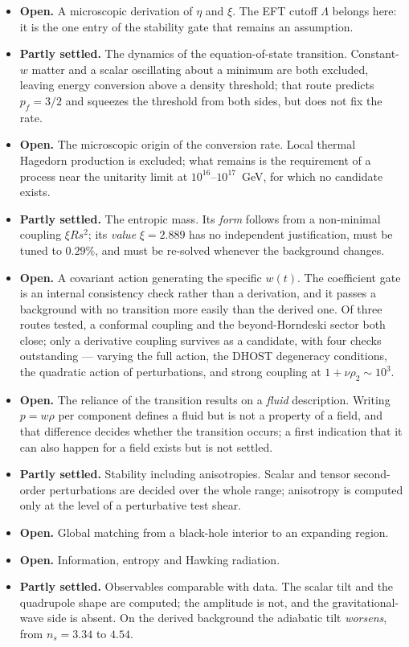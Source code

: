 \documentclass[a4paper,11pt]{article}
\begin{document}
\begin{itemize}
\item \textbf{Open.} A microscopic derivation of $\eta$ and $\xi$. The EFT cutoff $\Lambda$ belongs here: it is the one entry of the stability gate that remains an assumption.
\item \textbf{Partly settled.} The dynamics of the equation-of-state transition. Constant-$w$ matter and a scalar oscillating about a minimum are both excluded, leaving energy conversion above a density threshold; that route predicts $p_f=3/2$ and squeezes the threshold from both sides, but does not fix the rate.
\item \textbf{Open.} The microscopic origin of the conversion rate. Local thermal Hagedorn production is excluded; what remains is the requirement of a process near the unitarity limit at $10^{16}$--$10^{17}$~GeV, for which no candidate exists.
\item \textbf{Partly settled.} The entropic mass. Its \emph{form} follows from a non-minimal coupling $\xi Rs^2$; its \emph{value} $\xi=2.889$ has no independent justification, must be tuned to $0.29\%$, and must be re-solved whenever the background changes.
\item \textbf{Open.} A covariant action generating the specific $w(t)$. The coefficient gate is an internal consistency check rather than a derivation, and it passes a background with no transition more easily than the derived one. Of three routes tested, a conformal coupling and the beyond-Horndeski sector both close; only a derivative coupling survives as a candidate, with four checks outstanding --- varying the full action, the DHOST degeneracy conditions, the quadratic action of perturbations, and strong coupling at $1+\nu\rho_2\sim10^3$.
\item \textbf{Open.} The reliance of the transition results on a \emph{fluid} description. Writing $p=w\rho$ per component defines a fluid but is not a property of a field, and that difference decides whether the transition occurs; a first indication that it can also happen for a field exists but is not settled.
\item \textbf{Partly settled.} Stability including anisotropies. Scalar and tensor second-order perturbations are decided over the whole range; anisotropy is computed only at the level of a perturbative test shear.
\item \textbf{Open.} Global matching from a black-hole interior to an expanding region.
\item \textbf{Open.} Information, entropy and Hawking radiation.
\item \textbf{Partly settled.} Observables comparable with data. The scalar tilt and the quadrupole shape are computed; the amplitude is not, and the gravitational-wave side is absent. On the derived background the adiabatic tilt \emph{worsens}, from $n_s=3.34$ to $4.54$.
\end{itemize}
\end{document}
